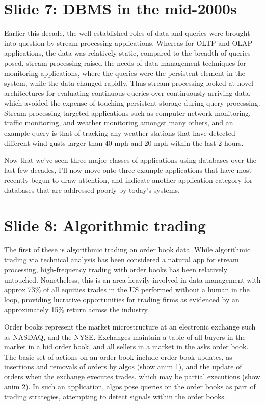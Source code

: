 \documentclass{article}
\begin{document}
\section{Slide 7: DBMS in the mid-2000s}
Earlier this decade, the well-established roles of data and queries were brought
into question by stream processing applications. Whereas for OLTP and OLAP
applications, the data was relatively static, compared to the breadth of queries
posed, stream processing raised the needs of data management techniques for
monitoring applications, where the queries were the persistent element in the
system, while the data changed rapidly. Thus stream processing looked at novel
architectures for evaluating continuous queries over continuously arriving data,
which avoided the expense of touching persistent storage during query
processing.  Stream processing targeted applications such as computer network
monitoring, traffic monitoring, and weather monitoring amongst many others, and
an example query is that of tracking any weather stations that have detected
different wind gusts larger than 40 mph and 20 mph within the last 2 hours.

Now that we've seen three major classes of applications using databases over the
last few decades, I'll now move onto three example applications that have most
recently begun to draw attention, and indicate another application category for
databases that are addressed poorly by today's systems.

\section{Slide 8: Algorithmic trading}
The first of these is algorithmic trading on order book data. While algorithmic
trading via technical analysis has been considered a natural app for stream
processing, high-frequency trading with order books has been relatively untouched.
Nonetheless, this is an area heavily involved in data management with approx
73\% of all equities trades in the US performed without a human in the loop,
providing lucrative opportunities for trading firms as evidenced by an
approximately 15\% return across the industry. 

Order books represent the market microstructure at an electronic exchange such
as NASDAQ, and the NYSE. Exchanges maintain a table of all buyers in the market
in a bid order book, and all sellers in a market in the asks order book. The
basic set of actions on an order book include order book updates, as insertions
and removals of orders by algos (show anim 1), and the update of orders when the
exchange executes trades, which may be partial executions (show anim 2). In such
an application, algos pose queries on the order books as part of trading
strategies, attempting to detect signals within the order books.
\end{document}
